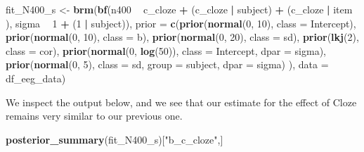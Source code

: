 \documentclass[12pt,]{krantz}
\newenvironment{Shaded}{\begin{snugshade}}{\end{snugshade}}
\newcommand{\DataTypeTok}[1]{\textcolor[rgb]{0.13,0.29,0.53}{#1}}
\newcommand{\DecValTok}[1]{\textcolor[rgb]{0.00,0.00,0.81}{#1}}
\newcommand{\KeywordTok}[1]{\textcolor[rgb]{0.13,0.29,0.53}{\textbf{#1}}}
\newcommand{\NormalTok}[1]{#1}
\newcommand{\OperatorTok}[1]{\textcolor[rgb]{0.81,0.36,0.00}{\textbf{#1}}}
\newcommand{\StringTok}[1]{\textcolor[rgb]{0.31,0.60,0.02}{#1}}
\theoremstyle{definition}
\theoremstyle{definition}
\theoremstyle{definition}
\theoremstyle{remark}
\begin{document}
\begin{Shaded}
\begin{Highlighting}[]
\NormalTok{fit_N400_s <-}\StringTok{ }\KeywordTok{brm}\NormalTok{(}\KeywordTok{bf}\NormalTok{(n400 }\OperatorTok{~}\StringTok{ }\NormalTok{c_cloze }\OperatorTok{+}\StringTok{ }\NormalTok{(c_cloze }\OperatorTok{|}\StringTok{ }\NormalTok{subject) }\OperatorTok{+}\StringTok{ }\NormalTok{(c_cloze }\OperatorTok{|}\StringTok{ }\NormalTok{item ),}
\NormalTok{                       sigma }\OperatorTok{~}\StringTok{ }\DecValTok{1} \OperatorTok{+}\StringTok{ }\NormalTok{(}\DecValTok{1} \OperatorTok{|}\StringTok{ }\NormalTok{subject)),}
                  \DataTypeTok{prior =}
                      \KeywordTok{c}\NormalTok{(}\KeywordTok{prior}\NormalTok{(}\KeywordTok{normal}\NormalTok{(}\DecValTok{0}\NormalTok{, }\DecValTok{10}\NormalTok{), }\DataTypeTok{class =}\NormalTok{ Intercept),}
                        \KeywordTok{prior}\NormalTok{(}\KeywordTok{normal}\NormalTok{(}\DecValTok{0}\NormalTok{, }\DecValTok{10}\NormalTok{), }\DataTypeTok{class =}\NormalTok{ b),}
                        \KeywordTok{prior}\NormalTok{(}\KeywordTok{normal}\NormalTok{(}\DecValTok{0}\NormalTok{, }\DecValTok{20}\NormalTok{), }\DataTypeTok{class =}\NormalTok{ sd),}
                        \KeywordTok{prior}\NormalTok{(}\KeywordTok{lkj}\NormalTok{(}\DecValTok{2}\NormalTok{), }\DataTypeTok{class =}\NormalTok{ cor),}
                        \KeywordTok{prior}\NormalTok{(}\KeywordTok{normal}\NormalTok{(}\DecValTok{0}\NormalTok{, }\KeywordTok{log}\NormalTok{(}\DecValTok{50}\NormalTok{)), }\DataTypeTok{class =}\NormalTok{ Intercept, }\DataTypeTok{dpar =}\NormalTok{ sigma),}
                        \KeywordTok{prior}\NormalTok{(}\KeywordTok{normal}\NormalTok{(}\DecValTok{0}\NormalTok{, }\DecValTok{5}\NormalTok{), }\DataTypeTok{class =}\NormalTok{ sd, }\DataTypeTok{group =}\NormalTok{ subject, }
                              \DataTypeTok{dpar =}\NormalTok{ sigma)}
\NormalTok{                        ),}
                  \DataTypeTok{data =}\NormalTok{ df_eeg_data)}
\end{Highlighting}
\end{Shaded}

We inspect the output below, and we see that our estimate for the effect of Cloze
remains very similar to our previous one.

\begin{Shaded}
\begin{Highlighting}[]
\KeywordTok{posterior_summary}\NormalTok{(fit_N400_s)[}\StringTok{"b_c_cloze"}\NormalTok{,]}
\end{Highlighting}
\end{Shaded}
\end{document}
